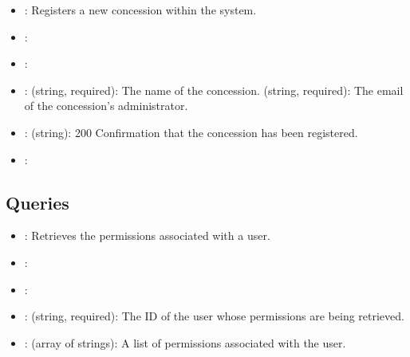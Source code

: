 \documentclass[letterpaper,10pt,english]{sphinxmanual}
\begin{document}
\sphinxAtStartPar
{}
\begin{itemize}
\item {} 
\sphinxAtStartPar
{}: Registers a new concession within the system.

\item {} 
\sphinxAtStartPar
{}: 

\item {} 
\sphinxAtStartPar
{}: 

\item {} 
\sphinxAtStartPar
{}:
\sphinxhyphen{}  (string, required): The name of the concession.
\sphinxhyphen{}  (string, required): The email of the concession’s administrator.

\item {} 
\sphinxAtStartPar
{}:
\sphinxhyphen{}  (string): 200 \textendash{} Confirmation that the concession has been registered.

\item {} 
\sphinxAtStartPar
{}: 

\end{itemize}


\subsection{Queries}
\label{\detokenize{crm_system/authorization_service:queries}}
\sphinxAtStartPar
{}
\begin{itemize}
\item {} 
\sphinxAtStartPar
{}: Retrieves the permissions associated with a user.

\item {} 
\sphinxAtStartPar
{}: 

\item {} 
\sphinxAtStartPar
{}: 

\item {} 
\sphinxAtStartPar
{}:
\sphinxhyphen{}  (string, required): The ID of the user whose permissions are being retrieved.

\item {} 
\sphinxAtStartPar
{}:
\sphinxhyphen{}  (array of strings): A list of permissions associated with the user.

\end{itemize}
\end{document}
